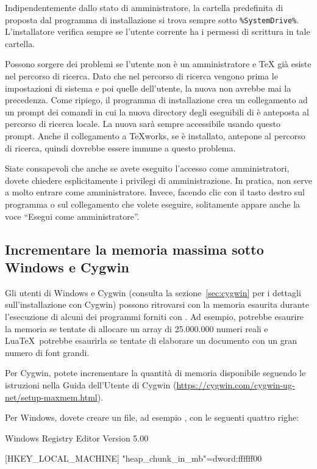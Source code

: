 \documentclass{article}
\begin{document}
Indipendentemente dallo stato di amministratore, la cartella predefinita
di \TL{} proposta dal programma di installazione si trova sempre sotto
\verb|%SystemDrive%|. L'installatore verifica sempre se l'utente corrente
ha i permessi di scrittura in tale cartella.

Possono sorgere dei problemi se l'utente non è un amministratore e \TeX{}
già esiste nel percorso di ricerca. Dato che nel percorso di ricerca
vengono prima le impostazioni di sistema e poi quelle dell'utente, la
nuova \TL{} non avrebbe mai la precedenza. Come ripiego, il programma
di installazione crea un collegamento ad un prompt dei comandi in cui la
nuova directory degli eseguibili di \TL{} è anteposta al percorso di
ricerca locale. La nuova \TL{} sarà sempre accessibile usando questo
prompt. Anche il collegamento a \TeX{}works, se è installato, antepone
\TL{} al percorso di ricerca, quindi dovrebbe essere immune a questo
problema.

Siate consapevoli che anche se avete eseguito l'accesso come amministratori,
dovete chiedere esplicitamente i privilegi di amministrazione. In pratica, non
serve a molto entrare come amministratore. Invece, facendo clic con il tasto
destro sul programma o sul collegamento che volete eseguire, solitamente appare
anche la voce ``Esegui come amministratore''.


\subsection{Incrementare la memoria massima sotto Windows e Cygwin}
\label{sec:cygwin-maxmem}

Gli utenti di Windows e Cygwin (consulta la sezione~\ref{sec:cygwin} per i
dettagli sull'installazione con Cygwin) possono ritrovarsi con la memoria
esaurita durante l'esecuzione di alcuni dei programmi forniti con \TL. Ad
esempio,  potrebbe esaurire la memoria se tentate di allocare un
array di 25.000.000 numeri reali e Lua\TeX\ potrebbe esaurirla se tentate di
elaborare un documento con un gran numero di font grandi.

Per Cygwin, potete incrementare la quantità di memoria disponibile seguendo
le istruzioni nella Guida dell'Utente di Cygwin
(\url{https://cygwin.com/cygwin-ug-net/setup-maxmem.html}).

Per Windows, dovete creare un file, ad esempio , con le
seguenti quattro righe:

\begin{sverbatim}
Windows Registry Editor Version 5.00

[HKEY_LOCAL_MACHINE\Software\Cygwin]
"heap_chunk_in_mb"=dword:ffffff00
\end{sverbatim}
\end{document}
